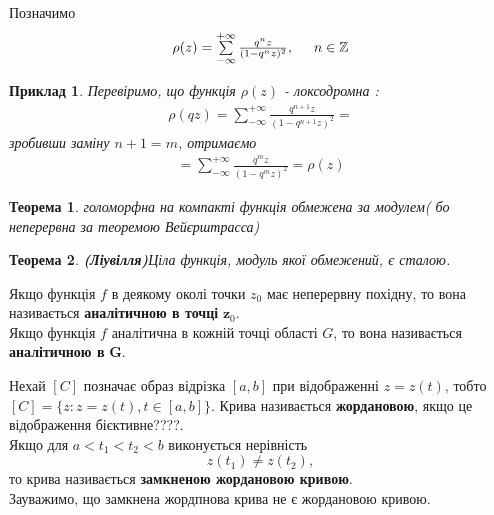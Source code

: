 \documentclass[12pt,a4paper]{article}
\begin{document}
\begin{ozn}
  Позначимо
  \[\begin{array}{l}
   \rho(z)=\sum\limits^{+\infty}_{-\infty}  \frac{q^{n}z}{(1-q^{n}z)^2} ,
   \hspace{0,5cm} n\in \mathbb{Z}
   \end{array}\]
\end{ozn}
\vspace{1,5cm}

\newtheorem{pryk}{Приклад}
\begin{pryk}
Перевіримо, що функція $\rho(z)$ - локсодромна :\\
\[\begin{array}{l}
 \rho(qz)=\sum\limits^{+\infty}_{-\infty}  \frac{q^{n+1}z}{(1-q^{n+1}z)^2}=
\end{array}\]
зробивши заміну $n+1=m$, отримаємо
\[\begin{array}{l}
=\sum\limits^{+\infty}_{-\infty}  \frac{q^{m}z}{(1-q^{m}z)^2}=\rho(z)
\end{array}\]
\end{pryk}
\vspace{1cm}

\newtheorem{thm}{Теорема}
\newtheorem*{thmNoNum}{Теорема}
\begin{thmNoNum} голоморфна на компакті функція обмежена за модулем( бо неперервна за теоремою Вейєрштрасса)
\end{thmNoNum}
\vspace{1,5cm}

\begin{thmNoNum}
\textbf{(Ліувілля)}\label{thLiuv}
 Ціла функція, модуль якої обмежений, є сталою.
\end{thmNoNum}
\vspace{1,5cm}

\begin{ozn}
Якщо функція $f$ в деякому околі точки $z_{0}$ має неперервну похідну, то вона називається \textbf{аналітичною в точці} $\mathbf z_{0}$. \\
Якщо функція $f$ аналітична в кожній точці області $G$, то вона називається \textbf{аналітичною в} \label{analitFun}  $\mathbf G$.
\end{ozn}
\vspace{1,5cm}

\begin{ozn}
Нехай $\left [ C  \right ]$ позначає образ відрізка $\left [ a,b  \right ]$  при відображенні $z=z(t)$, тобто $ \left [ C  \right ]=\lbrace z:z=z(t), t \in \left [ a,b  \right ] \rbrace$. Крива називається \textbf{жордановою}\label{GordKryva}, якщо це відображення бієктивне????.\\
Якщо для $a < t_{1} < t_{2} < b$ виконується нерівність $$ z(t_{1})\neq z(t_{2}),$$  то крива називається \textbf{замкненою жордановою кривою}.\\
Зауважимо, що замкнена жордпнова крива не є жордановою кривою.
\end{ozn}
\vspace{1,5cm}
\end{document}
